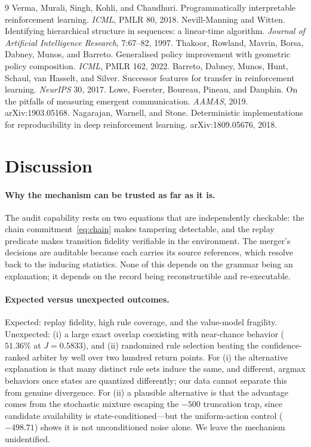 \documentclass[11pt]{article}
\begin{document}

\begin{thebibliography}{9}
Verma, Murali, Singh, Kohli, and Chaudhuri. Programmatically interpretable reinforcement learning.
\emph{ICML}, PMLR 80, 2018.
Nevill-Manning and Witten. Identifying hierarchical structure in sequences: a linear-time algorithm.
\emph{Journal of Artificial Intelligence Research}, 7:67--82, 1997.
Thakoor, Rowland, Mavrin, Borsa, Dabney, Munos, and Barreto. Generalised policy improvement with
geometric policy composition. \emph{ICML}, PMLR 162, 2022.
Barreto, Dabney, Munos, Hunt, Schaul, van Hasselt, and Silver. Successor features for transfer in
reinforcement learning. \emph{NeurIPS} 30, 2017.
Lowe, Foerster, Boureau, Pineau, and Dauphin. On the pitfalls of measuring emergent communication.
\emph{AAMAS}, 2019. arXiv:1903.05168.
Nagarajan, Warnell, and Stone. Deterministic implementations for reproducibility in deep
reinforcement learning. arXiv:1809.05676, 2018.
\end{thebibliography}

\section{Discussion}
\label{sec:discussion}

\paragraph{Why the mechanism can be trusted as far as it is.}
The audit capability rests on two equations that are independently checkable: the chain
commitment~\eqref{eq:chain} makes tampering detectable, and the replay predicate makes transition
fidelity verifiable in the environment. The merger's decisions are auditable because each carries
its source references, which resolve back to the inducing statistics. None of this depends on the
grammar being an explanation; it depends on the record being reconstructible and re-executable.

\paragraph{Expected versus unexpected outcomes.}
Expected: replay fidelity, high rule coverage, and the value-model fragility. Unexpected: (i) a
large exact overlap coexisting with near-chance behavior ($51.36\%$ at $J=0.5833$), and (ii)
randomized rule selection beating the confidence-ranked arbiter by well over two hundred return
points. For (i) the alternative explanation is that many distinct rule sets induce the same, and
different, argmax behaviors once states are quantized differently; our data cannot separate this
from genuine divergence. For (ii) a plausible alternative is that the advantage comes from the
stochastic mixture escaping the $-500$ truncation trap, since candidate availability is
state-conditioned---but the uniform-action control ($-498.71$) shows it is not unconditioned noise
alone. We leave the mechanism unidentified.
\end{document}
